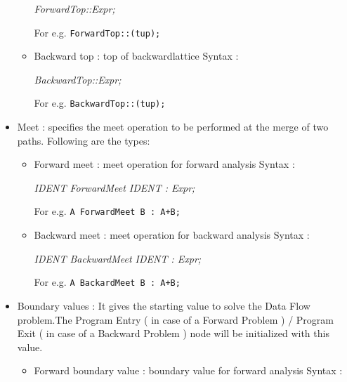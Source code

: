 \documentclass[11pt,a4paper,openright]{report}
\begin{document}
\begin{itemize}
\begin{itemize}
					    \hspace{15mm} \textit{ForwardTop::Expr;}
					    
					    \hspace{15mm} For e.g. \texttt{ForwardTop::(tup){};}
	\item Backward top : top of backwardlattice
	 \newline Syntax : 
			  
					    \hspace{15mm} \textit{BackwardTop::Expr;}
						    
					    \hspace{15mm} For e.g. \texttt{BackwardTop::(tup){};}

					   
\end{itemize}

\item Meet : specifies the meet operation to be performed at the merge of two paths. Following are the types:
\begin{itemize}
	\item Forward meet : meet operation for forward analysis
			  \newline Syntax : 
			  
					    \hspace{15mm} \textit{IDENT ForwardMeet IDENT : Expr;}
					    
					    \hspace{15mm} For e.g. \texttt{A ForwardMeet B : A+B;}
	\item Backward meet : meet operation for backward analysis
	 \newline Syntax : 
			  
					    \hspace{15mm} \textit{IDENT BackwardMeet IDENT : Expr;}
					    
					    \hspace{15mm} For e.g. \texttt{A BackardMeet B : A+B;}

					   
\end{itemize}

\item Boundary values : It gives the starting value to solve the Data Flow problem.The
Program Entry ( in case of a Forward Problem ) / Program Exit ( in case of a Backward
Problem ) node will be initialized with this value.
\begin{itemize}
	\item Forward boundary value : boundary value for forward analysis
			  \newline Syntax : 
			  

\end{itemize}
\end{itemize}
\end{document}

